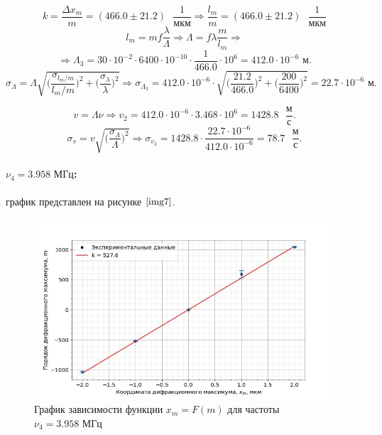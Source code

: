 \documentclass[a4paper,12pt]{article} %
\begin{document}
\[ k = \frac{\Delta x_{m}}{m} = (466.0\pm21.2)\text{ }\frac{1}{\text{мкм}} \Rightarrow \frac{l_{m}}{m} = (466.0\pm21.2)\text{ }\frac{1}{\text{мкм}} \]
\[ l_{m}=mf\frac{\lambda}{\Lambda} \Rightarrow \Lambda = f\lambda\frac{m}{l_{m}} \Rightarrow  \]
\[ \Rightarrow \Lambda_3 = 30\cdot10^{-2}\cdot6400\cdot10^{-10}\cdot\frac{1}{466.0}\cdot10^{6}=412.0\cdot10^{-6}\text{ м}. \]
\[ \sigma_{\Lambda} = \Lambda\sqrt{\Big(\frac{\sigma_{l_{m}/m}}{l_{m}/m}\Big)^2+ \Big(\frac{\sigma_{\lambda}}{\lambda}\Big)^2} \Rightarrow \sigma_{\Lambda_3} = 412.0\cdot10^{-6}\cdot\sqrt{\Big(\frac{21.2}{466.0}\Big)^2+\Big(\frac{200}{6400}\Big)^2} = 22.7\cdot10^{-6}\text{ м}. \]

\centering{}

\[ v=\Lambda\nu \Rightarrow v_2=412.0\cdot10^{-6}\cdot3.468\cdot10^{6}=1428.8\text{ }\frac{\text{м}}{\text{с}}. \]
\[ \sigma_{v} = v\sqrt{\Big(\frac{\sigma_{\Lambda}}{\Lambda}\Big)^2} \Rightarrow \sigma_{v_3} = 1428.8\cdot\frac{22.7\cdot10^{-6}}{412.0\cdot10^{-6}} = 78.7\text{ }\frac{\text{м}}{\text{с}}. \]

\centering{}

\newpage

\raggedright\paragraph{$\nu_4=3.958\text{ МГц}$:} график представлен на рисунке $\ref{img7}$.

\begin{figure}[h]
    \begin{center}
        \includegraphics[width=16cm]{image4.jpg}
    \end{center}
    \caption{График зависимости функции $x_m=F(m)$ для частоты $\nu_4=3.958\text{ МГц}$}
    \label{img7}
\end{figure}
\end{document}

